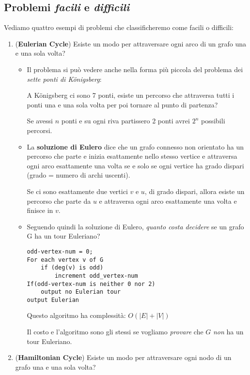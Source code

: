 \documentclass[a4paper]{article}
\theoremstyle{definition}
\begin{document}
	\subsection{Problemi \textit{facili} e \textit{difficili}}
		Vediamo quattro esempi di problemi che classificheremo come facili o difficili:
		\begin{enumerate}
			\item (\textbf{Eulerian Cycle}) Esiste un modo per attraversare ogni arco di un grafo una e una sola volta?
			
			\begin{itemize}
				\item Il problema si può vedere anche nella forma più piccola del problema dei \textit{sette ponti di Königsberg}:
			
				A Königsberg ci sono 7 ponti, esiste un percorso che attraversa tutti i ponti una e una sola volta per poi tornare al punto di partenza?
			
				Se avessi $ n $ ponti e su ogni riva partissero 2 ponti avrei $ 2^n $ possibili percorsi.
			
				\item La \textbf{soluzione di Eulero} dice che un grafo connesso non orientato ha un percorso che parte e inizia esattamente nello stesso vertice e attraversa ogni arco esattamente una volta se e solo se ogni vertice ha grado dispari (grado = numero di archi uscenti).
				
				Se ci sono esattamente due vertici $ v $ e $ u $, di grado dispari, allora esiste un percorso che parte da $ u $ e attraversa ogni arco esattamente una volta e finisce in $ v $.
				
				\item Seguendo quindi la soluzione di Eulero, \textit{quanto costa decidere} se un grafo G ha un tour Euleriano?
				\begin{lstlisting}[basicstyle=\footnotesize\ttfamily]
odd-vertex-num = 0;
For each vertex v of G
	if (deg(v) is odd)
		increment odd_vertex-num
If(odd-vertex-num is neither 0 nor 2)
	output no Eulerian tour
output Eulerian	
				\end{lstlisting}
				Questo algoritmo ha complessità: $ O(|E| + |V|) $
				
				Il costo e l'algoritmo sono gli stessi se vogliamo \textit{provare} che $ G $ \textit{non} ha un tour Euleriano.
				
			\end{itemize}
			
			\item (\textbf{Hamiltonian Cycle}) Esiste un modo per attraversare ogni nodo di un grafo una e una sola volta? 
			

\end{enumerate}
\end{document}
